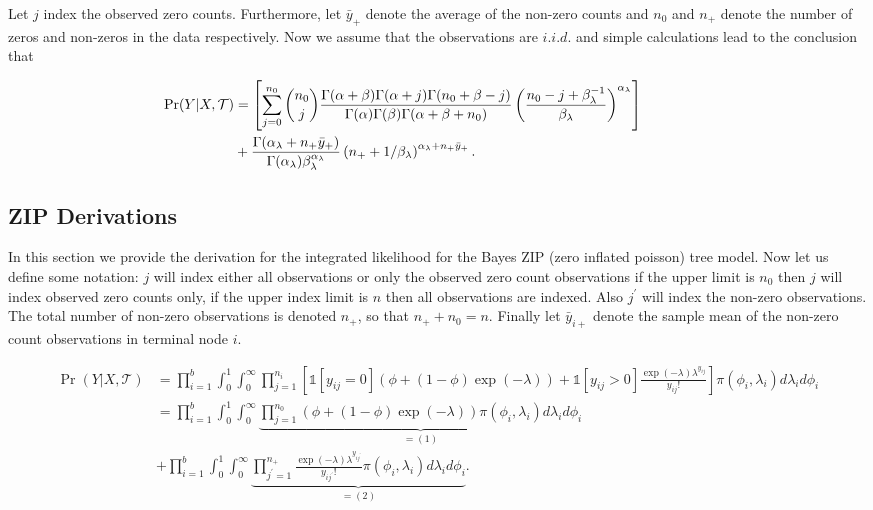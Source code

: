\documentclass{article}
\def\newabbrev#1{\label{#1}}
\begin{document}
 Let $j$ index the observed zero counts. Furthermore, let $\bar{y}_{+}$ denote the average of the non-zero counts and $n_0$ and $n_+$ denote the number of zeros and non-zeros in the data respectively. 
 Now we assume that the observations are $i.i.d.$ and simple calculations lead to the conclusion that
 
 \begin{align}\label{eqn:zip_int_lhood}\hspace{-.7in}
 \Pr(Y\vert X, \mathcal{T})& = \left[\sum_{j=0}^{n_0} {n_0 \choose j}\frac{\Gamma(\alpha+\beta)\Gamma(\alpha+j)\Gamma(n_0+\beta-j)}{\Gamma(\alpha)\Gamma(\beta)\Gamma(\alpha+\beta+n_0)}\left(\frac{n_0-j+\beta_{\lambda}^{-1}}{\beta_{\lambda}}\right)^{\alpha_{\lambda}} \right] \\ \nonumber
 & + \frac{\Gamma(\alpha_{\lambda}+n_+\bar{y}_+)}{\Gamma(\alpha_{\lambda})\beta_{\lambda}^{\alpha_{\lambda}}}\left(n_+ + 1/\beta_{\lambda} \right)^{\alpha_{\lambda}+n_+\bar{y}_+}.
\end{align}

\subsection{ZIP Derivations}

In this section we provide the derivation for the integrated likelihood for the Bayes ZIP\newabbrev{abbrev:ZIP} (zero inflated poisson) tree model. Now let us define some notation: $j$ will index either all observations or only the observed zero count observations if the upper limit is $n_0$ then $j$ will index observed zero counts only, if the upper index limit is $n$ then all observations are indexed. Also $j^{\prime}$ will index the non-zero observations. The total number of non-zero observations is denoted $n_+$, so that $n_++n_0=n$. Finally let $\bar{y}_{i+}$ denote the sample mean of the non-zero count observations in terminal node $i$. 

\begin{align*}
\Pr(Y \vert X, \mathcal{T}) &= \prod_{i=1}^b\int_0^1\int_0^\infty\prod_{j=1}^{n_i}\left[\mathds{1}[y_{ij}=0](\phi+(1-\phi)\exp{(-\lambda)})+\mathds{1}[y_{ij}>0]\frac{\exp{(-\lambda)\lambda^{y_{ij}}}}{y_{ij}!} \right]\pi(\phi_i,\lambda_i )d\lambda_id\phi_i\\
&=\prod_{i=1}^b \int_0^1\int_0^\infty\underbrace{\prod_{j=1}^{n_0}(\phi + (1-\phi)\exp{(-\lambda)})\pi(\phi_i,\lambda_i )d\lambda_id\phi_i}_{=(1)}\\ 
&+ \prod_{i=1}^b \int_0^1\int_0^\infty \underbrace{\prod_{j^\prime=1}^{n_+}\frac{\exp{(-\lambda)}\lambda^{y_{ij^\prime}} }{y_{ij^\prime}!}\pi(\phi_i,\lambda_i )d\lambda_id\phi_i}_{=(2)}.\\ 
\end{align*} 
\end{document}

